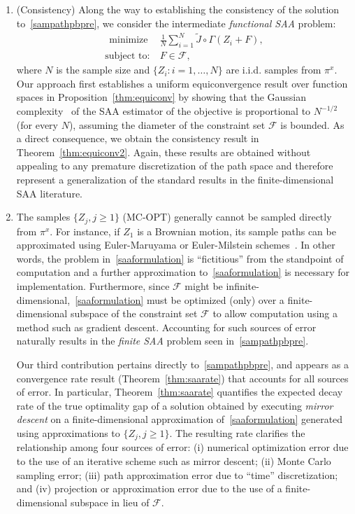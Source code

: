 \documentclass[11pt,leqno]{amsart}
\begin{document}
\begin{enumerate}[leftmargin=*]
\item (Consistency) Along the way to establishing the consistency of the solution to~\eqref{sampathpbpre}, we consider the intermediate \emph{functional SAA} problem:
\begin{align}~\label{saaformulation}~\tag{MC-OPT}
    \text{minimize}&~\frac{1}{N} \sum_{i=1}^N \tilde J \circ \Gamma (Z_i + F),\\
    \text{subject to:}&~F \in \mathcal F, \nonumber
\end{align}
where $N$ is the sample size and $\{Z_i : i = 1,\ldots, N\}$ are i.i.d. samples from $\pi^x$. Our approach first establishes a uniform equiconvergence result over function spaces in Proposition~\ref{thm:equiconv} by showing that the Gaussian complexity~\citep{bartlett2002rademacher} of the SAA estimator of the objective is  proportional to $N^{-1/2}$ (for every $N$), assuming the diameter of the constraint set $\mathcal F$ is bounded. As a direct consequence, we obtain the consistency result in Theorem~\ref{thm:equiconv2}. Again, these results are obtained without appealing to any premature discretization of the path space and therefore represent a generalization of the standard results in the finite-dimensional SAA literature. 

\item The samples $\{Z_j, j \geq 1\}$ (MC-OPT) generally cannot be sampled directly from $\pi^x$. For instance, if $Z_1$ is a Brownian motion, its sample paths can be approximated using Euler-Maruyama or Euler-Milstein schemes~\citep{Asmussen_2007}. In other words, the problem in~\eqref{saaformulation} is ``fictitious'' from the standpoint of computation and a further approximation to~\eqref{saaformulation} is necessary for implementation. Furthermore, since $\mathcal{F}$ might be infinite-dimensional,~\eqref{saaformulation} must be optimized (only) over a finite-dimensional subspace of the constraint set $\mathcal{F}$ to allow computation using a method such as gradient descent. Accounting for such sources of error naturally results in the {\it finite SAA} problem seen in~\eqref{sampathpbpre}. 

Our third contribution pertains directly to~\eqref{sampathpbpre}, and appears as a  convergence rate result (Theorem~\ref{thm:saarate}) that accounts for all sources of error. In particular, Theorem~\ref{thm:saarate} quantifies the expected decay rate of the true optimality gap of a solution obtained by executing \emph{mirror descent} on a finite-dimensional approximation of~\eqref{saaformulation} generated using approximations to $\{Z_j, j \geq 1\}$. The resulting rate clarifies the relationship among four sources of error: (i) numerical optimization error due to the use of an iterative scheme such as mirror descent; (ii) Monte Carlo sampling error;  (iii) path approximation error due to ``time'' discretization; and (iv) projection or approximation error due to the use of a finite-dimensional subspace in lieu of $\mathcal{F}$. 


\end{enumerate}
\end{document}
